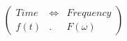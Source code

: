 \documentclass[preview]{standalone}
\begin{document}
\begin{align*}
\left( \begin{array}{cl} Time & \Longleftrightarrow & Frequency \\ f(t) & . & F(\omega) \end{array} \right)
\end{align*}
\end{document}
